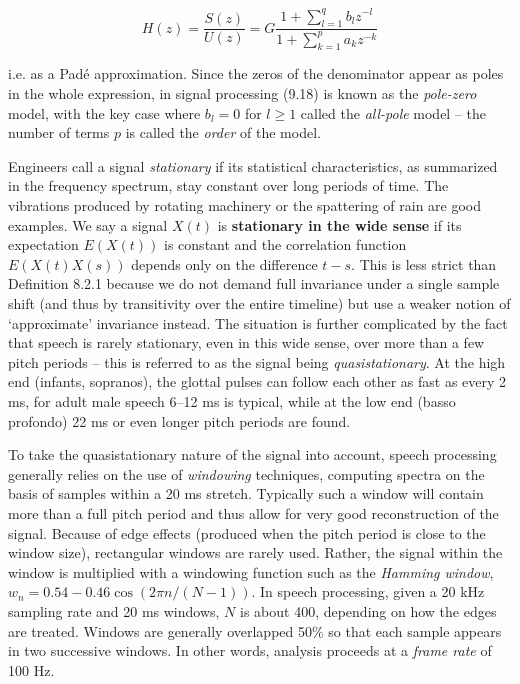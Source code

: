 \vspace*{-4.5mm}
\begin{equation}
H(z)=\frac{S(z)}{U(z)}=G\frac{1+\sum_{l=1}^q b_l z^{-l}}{1+\sum_{k=1}^p a_k
  z^{-k}}
\end{equation}

\noindent
i.e. as a Pad\'e approximation. Since the zeros of the denominator appear as
poles in the whole expression, in signal processing (9.18) is known as the
{\it pole-zero} model, with the key case where $b_l=0$ for $l \geq 1$ 
called the {\it all-pole} model -- the number of terms $p$ is called the 
{\it order} of the model.

Engineers call a signal {\it stationary} if its
statistical characteristics, as summarized in the frequency spectrum, stay
constant over long periods of time. The vibrations produced by rotating
machinery or the spattering of rain are good examples. We say a signal $X(t)$
is {\bf stationary in the wide sense} if its expectation $E(X(t))$ is constant and the correlation function
$E(X(t)X(s))$ depends only on the difference $t-s$.  This is less strict than
Definition 8.2.1 because we do not demand full invariance under a single
sample shift (and thus by transitivity over the entire timeline) but use a
weaker notion of `approximate' invariance instead. The situation is further
complicated by the fact that speech is rarely stationary, even in this wide
sense, over more than a few pitch periods -- this is referred to as the signal
being {\it quasistationary}. At the high end (infants, sopranos), the glottal
pulses can follow each other as fast as every 2 ms, for adult male speech
6--12 ms is typical, while at the low end (basso profondo) 22 ms or even
longer pitch periods are found. 

To take the quasistationary nature of the signal into account, speech
processing generally relies on the use of {\it windowing} techniques,
computing spectra on the basis of samples within a 20 ms stretch. Typically
such a window will contain more than a full pitch period and thus allow for
very good reconstruction of the signal. Because of edge effects (produced when
the pitch period is close to the window size), rectangular windows are rarely
used. Rather, the signal within the window is multiplied with a windowing
function such as the {\it Hamming window}, $w_n = 0.54
-0.46 \cos(2\pi n/(N-1))$.  In speech processing, given a 20 kHz sampling rate
and 20 ms windows, $N$ is about 400, depending on how the edges are
treated. Windows are generally overlapped 50\% so that each sample appears in
two successive windows. In other words, analysis proceeds at a {\it frame
  rate} of 100 Hz.

